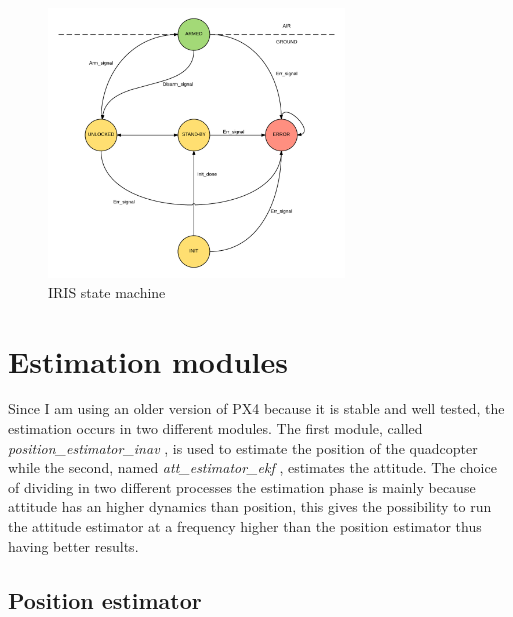 \begin{figure}[h]
	\centering
	\noindent
	\includegraphics[width=0.7\textwidth]{iris_state.png}
	\caption{IRIS state machine}
	\label{figure:iris_state}
\end{figure}


\section{Estimation modules}

Since I am using an older version of PX4 because it is stable and well tested, the estimation occurs in two different modules. The first module, called \textit{position\_estimator\_inav} , is used to estimate the position of the quadcopter while the second, named\textit{ att\_estimator\_ekf }, estimates the attitude. The choice of dividing in two different processes the estimation phase  is mainly because attitude has an higher dynamics than position, this gives the possibility to run the attitude estimator at a frequency higher than the position estimator thus having better results.

\subsection{Position estimator}

